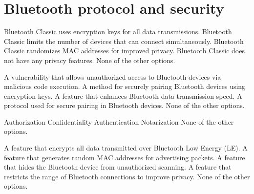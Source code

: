 \section{Bluetooth protocol and security}

\begin{checkboxes}
    \choice Bluetooth Classic uses encryption keys for all data transmissions.
    \choice Bluetooth Classic limits the number of devices that can connect simultaneously.
    \choice Bluetooth Classic randomizes MAC addresses for improved privacy.
    \choice Bluetooth Classic does not have any privacy features.
    \choice None of the other options.
\end{checkboxes}

\begin{checkboxes}
    \choice A vulnerability that allows unauthorized access to Bluetooth devices via malicious code execution.
    \choice A method for securely pairing Bluetooth devices using encryption keys.
    \choice A feature that enhances Bluetooth data transmission speed.
    \choice A protocol used for secure pairing in Bluetooth devices.
    \CorrectChoice None of the other options.
\end{checkboxes}

\begin{checkboxes}
    \CorrectChoice Authorization
    \CorrectChoice Confidentiality
    \CorrectChoice Authentication
    \choice Notarization
    \choice None of the other options.
\end{checkboxes}




\begin{checkboxes}
    \choice A feature that encrypts all data transmitted over Bluetooth Low Energy (LE).
    \CorrectChoice A feature that generates random MAC addresses for advertising packets.
    \choice A feature that hides the Bluetooth device from unauthorized scanning.
    \choice A feature that restricts the range of Bluetooth connections to improve privacy.
    \choice None of the other options.
\end{checkboxes}


